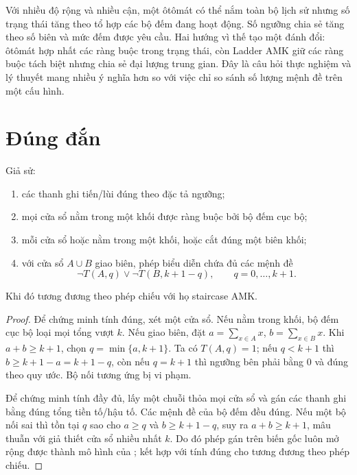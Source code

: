 Với nhiều độ rộng và nhiều cận, một ôtômát có thể nắm toàn bộ lịch sử nhưng số
trạng thái tăng theo tổ hợp các bộ đếm đang hoạt động. Số ngưỡng chia sẻ tăng
theo số biên và mức đếm được yêu cầu. Hai hướng vì thế tạo một đánh đổi:
ôtômát hợp nhất các ràng buộc trong trạng thái, còn Ladder AMK giữ các ràng
buộc tách biệt nhưng chia sẻ đại lượng trung gian. Đây là câu hỏi thực
nghiệm và lý thuyết mang nhiều ý nghĩa hơn so với việc chỉ so sánh số lượng mệnh đề trên một cấu hình.

\section{Đúng đắn}

\begin{theorem}
\label{thm:shared-window-correct}
Giả sử:
\begin{enumerate}
  \item các thanh ghi tiến/lùi đúng theo đặc tả ngưỡng;
  \item mọi cửa sổ nằm trong một khối được ràng buộc bởi bộ đếm cục bộ;
  \item mỗi cửa sổ hoặc nằm trong một khối, hoặc cắt đúng một biên khối;
  \item với cửa sổ \(A\cup B\) giao biên, phép biểu diễn chứa đủ các mệnh đề
  \[
    \neg T(A,q)\lor\neg T(B,k+1-q),
    \qquad q=0,\ldots,k+1.
  \]
\end{enumerate}
Khi đó \CNF tương đương theo phép chiếu với họ staircase AMK.
\end{theorem}

\begin{proof}
Để chứng minh tính đúng, xét một cửa sổ. Nếu nằm trong khối, bộ đếm cục bộ loại mọi tổng
vượt \(k\). Nếu giao biên, đặt \(a=\sum_{x\in A}x\),
\(b=\sum_{x\in B}x\). Khi \(a+b\ge k+1\), chọn
\(q=\min\{a,k+1\}\). Ta có \(T(A,q)=1\); nếu \(q<k+1\) thì
\(b\ge k+1-a=k+1-q\), còn nếu \(q=k+1\) thì ngưỡng bên phải bằng \(0\)
và đúng theo quy ước. Bộ nối tương ứng bị vi phạm.

Để chứng minh tính đầy đủ, lấy một chuỗi thỏa mọi cửa sổ và gán các thanh ghi
bằng đúng tổng tiền tố/hậu tố. Các mệnh đề của bộ đếm đều đúng. Nếu một bộ nối sai thì tồn
tại \(q\) sao cho \(a\ge q\) và \(b\ge k+1-q\), suy ra \(a+b\ge k+1\),
mâu thuẫn với giả thiết cửa sổ nhiều nhất \(k\). Do đó phép gán trên biến gốc
luôn mở rộng được thành mô hình của \CNF; kết hợp với tính đúng cho tương đương
theo phép chiếu.
\end{proof}

